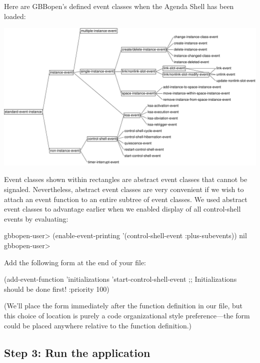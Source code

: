 \documentclass[10pt,twoside,english,pdftex]{article}
\begin{document}
Here are GBBopen's defined event classes when the Agenda Shell has
been loaded:
%
\T\begin{ifhtml}
\T\end{ifhtml}
\W\begin{iftex} 
\begin{center}
\includegraphics[scale=0.85]{agenda-shell-events}
\end{center}
\W\end{iftex}
%
Event classes shown within rectangles are abstract event classes that cannot
be signaled.  Nevertheless, abstract event classes are very convenient if we
wish to attach an event function to an entire subtree of event classes.  We
used abstract event classes to advantage earlier when we enabled display of
all control-shell events by evaluating:
%
\W\supp
\begin{example}
\textcolor{darkergray}{%
  gbbopen-user> (enable-event-printing '(control-shell-event :plus-subevents))
  nil
  gbbopen-user>}
\end{example}

Add the following form at the end of your 
file:
%
\W\supp
\begin{example}
  (add-event-function 'initializations 'start-control-shell-event
                      ;; Initializations should be done first!
                      :priority 100)
\end{example}
%
(We'll place the  form immediately after the
 function definition in our file, but this choice
of location is purely a code organizational style preference---the form could
be placed anywhere relative to the function definition.)

\subsection*{Step 3: Run the application}
\end{document}
